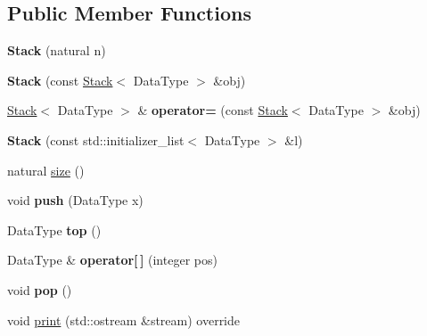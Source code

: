 \subsection*{Public Member Functions}
\begin{DoxyCompactItemize}
\item 
\mbox{\label{classez_1_1objects_1_1Stack_a7ec9250560820f1e2d3a2d038ce5fc87}} 
{\bfseries Stack} (natural n)
\item 
\mbox{\label{classez_1_1objects_1_1Stack_afa887dca608226e840113ffe385eedad}} 
{\bfseries Stack} (const \hyperlink{classez_1_1objects_1_1Stack}{Stack}$<$ Data\+Type $>$ \&obj)
\item 
\mbox{\label{classez_1_1objects_1_1Stack_a06d40590e7ef4db16d0de57c13033e8a}} 
\hyperlink{classez_1_1objects_1_1Stack}{Stack}$<$ Data\+Type $>$ \& {\bfseries operator=} (const \hyperlink{classez_1_1objects_1_1Stack}{Stack}$<$ Data\+Type $>$ \&obj)
\item 
\mbox{\label{classez_1_1objects_1_1Stack_af121f5e133d5ede9df531a167d5c0056}} 
{\bfseries Stack} (const std\+::initializer\+\_\+list$<$ Data\+Type $>$ \&l)
\item 
natural \hyperlink{classez_1_1objects_1_1Stack_a470a691a71af423a7d30719fd71cd385}{size} ()
\item 
\mbox{\label{classez_1_1objects_1_1Stack_acbf3f1637d3f9ec6ed25e55464754203}} 
void {\bfseries push} (Data\+Type x)
\item 
\mbox{\label{classez_1_1objects_1_1Stack_afbe2a20dc5e61d9b3dc733e723d47835}} 
Data\+Type {\bfseries top} ()
\item 
\mbox{\label{classez_1_1objects_1_1Stack_a97cf074a70d3da1cb2563fd9913760ab}} 
Data\+Type \& {\bfseries operator\mbox{[}$\,$\mbox{]}} (integer pos)
\item 
\mbox{\label{classez_1_1objects_1_1Stack_ac5896788d796c7b7d704f95713c0c4cf}} 
void {\bfseries pop} ()
\item 
void \hyperlink{classez_1_1objects_1_1Stack_a99dd22aaeedd73fb044aaf22c3cf12ac}{print} (std\+::ostream \&stream) override

\end{DoxyCompactItemize}
